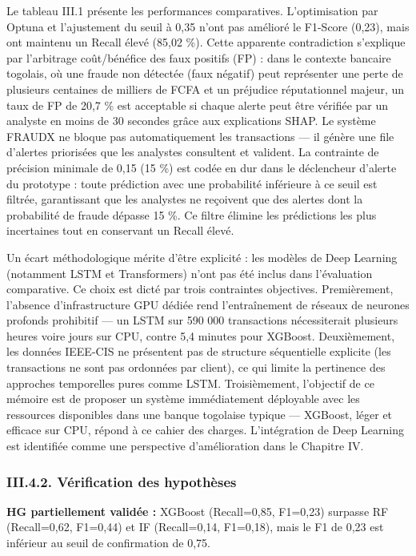 \documentclass[
  12pt,
]{article}
\begin{document}
Le tableau III.1 présente les performances comparatives. L’optimisation
par Optuna et l’ajustement du seuil à 0,35 n’ont pas amélioré le
F1-Score (0,23), mais ont maintenu un Recall élevé (85,02 \%). Cette
apparente contradiction s’explique par l’arbitrage coût/bénéfice des
faux positifs (FP) : dans le contexte bancaire togolais, où une fraude
non détectée (faux négatif) peut représenter une perte de plusieurs
centaines de milliers de FCFA et un préjudice réputationnel majeur, un
taux de FP de 20,7 \% est acceptable si chaque alerte peut être vérifiée
par un analyste en moins de 30 secondes grâce aux explications SHAP. Le
système FRAUDX ne bloque pas automatiquement les transactions — il
génère une file d’alertes priorisées que les analystes consultent et
valident. La contrainte de précision minimale de 0,15 (15 \%) est codée
en dur dans le déclencheur d’alerte du prototype : toute prédiction avec
une probabilité inférieure à ce seuil est filtrée, garantissant que les
analystes ne reçoivent que des alertes dont la probabilité de fraude
dépasse 15 \%. Ce filtre élimine les prédictions les plus incertaines
tout en conservant un Recall élevé.

Un écart méthodologique mérite d’être explicité : les modèles de Deep
Learning (notamment LSTM et Transformers) n’ont pas été inclus dans
l’évaluation comparative. Ce choix est dicté par trois contraintes
objectives. Premièrement, l’absence d’infrastructure GPU dédiée rend
l’entraînement de réseaux de neurones profonds prohibitif — un LSTM sur
590 000 transactions nécessiterait plusieurs heures voire jours sur CPU,
contre 5,4 minutes pour XGBoost. Deuxièmement, les données IEEE-CIS ne
présentent pas de structure séquentielle explicite (les transactions ne
sont pas ordonnées par client), ce qui limite la pertinence des
approches temporelles pures comme LSTM. Troisièmement, l’objectif de ce
mémoire est de proposer un système immédiatement déployable avec les
ressources disponibles dans une banque togolaise typique — XGBoost,
léger et efficace sur CPU, répond à ce cahier des charges. L’intégration
de Deep Learning est identifiée comme une perspective d’amélioration
dans le Chapitre IV.

\subsubsection{III.4.2. Vérification des
hypothèses}\label{iii.4.2.-vuxe9rification-des-hypothuxe8ses}

\textbf{HG partiellement validée :} XGBoost (Recall=0,85, F1=0,23)
surpasse RF (Recall=0,62, F1=0,44) et IF (Recall=0,14, F1=0,18), mais le
F1 de 0,23 est inférieur au seuil de confirmation de 0,75.
\end{document}
